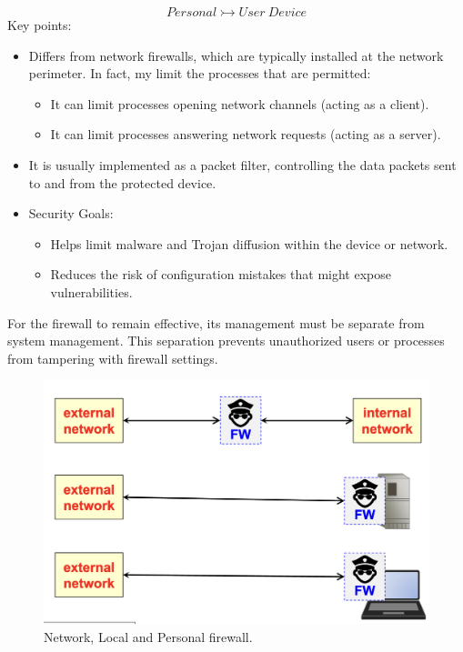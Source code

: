 \[
Personal \rightarrowtail User\ Device
\]
Key points:
\begin{itemize}
    \item Differs from network firewalls, which are typically installed at the network perimeter. In fact, my limit the processes that are permitted:
    \begin{itemize}
        \item It can limit processes opening network channels (acting as a client).
        \item It can limit processes answering network requests (acting as a server).
    \end{itemize}
    \item It is usually implemented as a packet filter, controlling the data packets sent to and from the protected device.
    \item Security Goals:
    \begin{itemize}
        \item Helps limit malware and Trojan diffusion within the device or network.
        \item Reduces the risk of configuration mistakes that might expose vulnerabilities.
    \end{itemize}
\end{itemize}

\begin{tcolorbox}[colback=red!10!white, colframe=red!70!black, coltitle=white, title=Beware]
    For the firewall to remain effective, its management must be separate from system management. This separation prevents unauthorized users or processes from tampering with firewall settings.
\end{tcolorbox}

\begin{figure}[H]
    \centering
    \includegraphics[width=0.7\linewidth]{Images/Firewalling/local_personal_firewall.png}
    \caption{Network, Local and Personal firewall.}
\end{figure}

